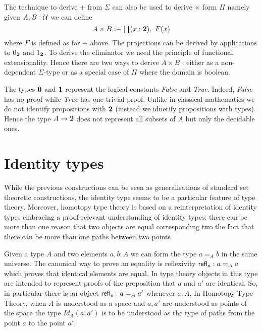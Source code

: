 The technique to derive $+$ from $\Sigma$ can also be used to derive
$\times$ form $\Pi$ namely given $A,B:\mathcal{U}$ we can define 
\[ A \times B \defeq \prd{x:\bool}F(x)\] where $F$ is defined as for
$+$ above. The projections can be derived by applications to $0_{\mathbf{2}}$
and $1_{\mathbf{2}}$. To derive the eliminator we need the principle of
functional extensionality. Hence there are two ways to derive $A\times
B$ : either as a non-dependent $\Sigma$-type or as a special case of
$\Pi$ where the domain is boolean.

The types $\mathbf{0}$ and $\mathbf{1}$ represent the logical constants
\emph{False} and \emph{True}. Indeed, \emph{False} has no proof while
\emph{True} has one trivial proof. Unlike in classical mathematics we
do not identify propositions with $\mathbf{2}$ (instead we idnetify
propositions with types). Hence the type $A \to \mathbf{2}$ does not
represent all subsets of $A$ but only the decidable ones.


\section{Identity types}
\label{sec:identity-types}

While the previous constructions can be seen as generalisations of
standard set theoretic constructions, the identity type seems to be
a particular feature of type theory. Moreover, homotopy type theory is
based on a reinterpretation of identity types embracing a
proof-relevant understanding of identity types: there can be more than
one reason that two objects are equal corresponding two the fact that
there can be more than one paths between two points.

Given a type $A$ and two elements $a,b:A$ we can form the type $a=_A
b$ in the same universe. The canonical way to prove an equality is
reflexivity $\mathsf{refl}_{a} : a =_A a$ which proves that identical elements
are equal. In type theory objects in this type are intended to
represent proofs of the proposition that $a$ and $a'$ are identical.
So, in particular there is an object $\mathsf{refl}_{a}: a =_A a'$ whenever
$a:A$. In Homotopy Type Theory, when $A$ is understood as a space and
$a,a'$ are understood as points of the space the type $Id_A(a,a')$ is
to be understood as the type of paths from the point $a$ to the point
$a'$.

